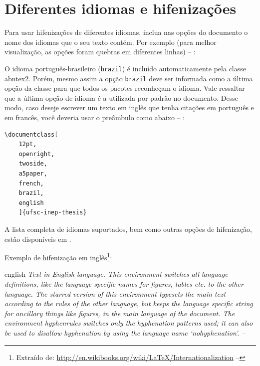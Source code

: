 \section{Diferentes idiomas e hifenizações}
\label{sec-hifenizacao}

Para usar hifenizações de diferentes idiomas, inclua nas opções do documento o
nome dos idiomas que o seu texto contém. Por exemplo (para melhor
visualização, as opções foram quebras em diferentes linhas) -- \showfont:


O idioma português-brasileiro (\texttt{brazil}) é incluído automaticamente pela
classe \textsf{abntex2}. Porém, mesmo assim a opção \texttt{brazil} deve ser
informada como a última opção da classe para que todos os pacotes reconheçam o
idioma. Vale ressaltar que a última opção de idioma é a utilizada por padrão no
documento. Desse modo, caso deseje escrever um texto em inglês que tenha
citações em português e em francês, você deveria usar o preâmbulo como abaixo --
\showfont:

\begin{verbatim}
\documentclass[
    12pt,
    openright,
    twoside,
    a5paper,
    french,
    brazil,
    english
    ]{ufsc-inep-thesis}
\end{verbatim}

A lista completa de idiomas suportados, bem como outras opções de hifenização,
estão disponíveis em \textcite[p.~5-6]{babel}.

Exemplo de hifenização em inglês\footnote{Extraído de:
\url{http://en.wikibooks.org/wiki/LaTeX/Internationalization} -- \showfont}:

\begin{otherlanguage*}{english}
\textit{Text in English language. This environment switches all
    language\hyp{}definitions, like the language specific names for figures,
    tables etc. to the other language. The starred version of this environment
    typesets the main text according to the rules of the other language, but
    keeps the language specific string for ancillary things like figures, in the
    main language of the document.  The environment hyphenrules switches only
    the hyphenation patterns used; it can also be used to disallow hyphenation
    by using the language name `nohyphenation'. -- \showfont}
\end{otherlanguage*}

